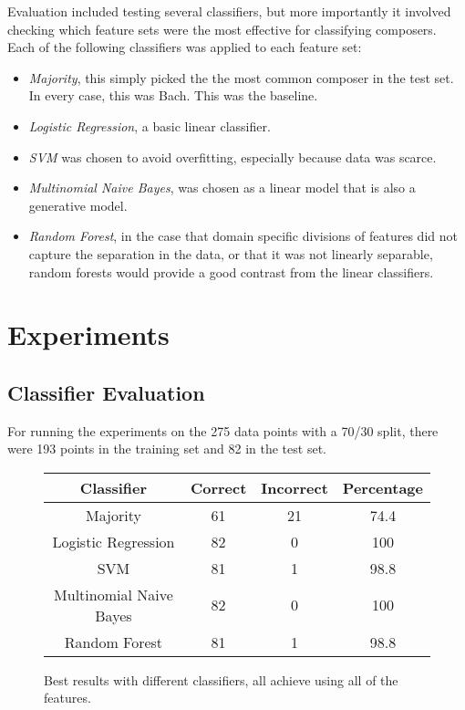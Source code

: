 \documentclass[10pt]{IEEEtran}
\begin{document}
Evaluation included testing several classifiers, but more importantly it
involved checking which feature sets were the most effective for classifying
composers. Each of the following classifiers was applied to each feature set:
\begin{itemize}
\item {\it Majority}, this simply picked the the most common composer in the
  test set. In every case, this was Bach. This was the baseline.

\item {\it Logistic Regression}, a basic linear classifier.

\item {\it SVM} was chosen to avoid overfitting, especially because data was
  scarce.

\item {\it Multinomial Naive Bayes}, was chosen as a linear model that is
  also a generative model.

\item {\it Random Forest}, in the case that domain specific divisions of
  features did not capture the separation in the data, or that it was not
  linearly separable, random forests would provide a good contrast from the
  linear classifiers.
\end{itemize}

\section{Experiments}

\subsection{Classifier Evaluation}

For running the experiments on the 275 data points with a 70/30 split, there
were 193 points in the training set and 82 in the test set.
\begin{figure}
\begin{center}
\begin{tabular}{c || c | c | c }
  Classifier & Correct & Incorrect & Percentage\\
  \hline
  Majority                & 61 & 21 & 74.4\\
  Logistic Regression     & 82 &  0 & 100\\
  SVM                     & 81 &  1 & 98.8\\
  Multinomial Naive Bayes & 82 &  0 & 100\\
  Random Forest           & 81 &  1 & 98.8\\
\end{tabular}
\end{center}
\caption{Best results with different classifiers, all achieve using all of the
  features.\label{classifier results}}
\end{figure}
\end{document}
